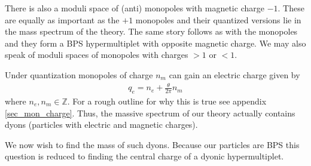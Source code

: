 \documentclass[12pt, onecolumn]{article}
\newenvironment{remark}[1][Remark]{\begin{trivlist}
\item[\hskip \labelsep {\bfseries #1}]}{\end{trivlist}}
\begin{document}
\begin{remark}
There is also a moduli space of (anti) monopoles with magnetic charge $-1$.  These are equally as important as the $+1$ monopoles and their quantized versions lie in the mass spectrum of the theory.  The same story follows as with the monopoles and they form a BPS hypermultiplet with opposite magnetic charge.  We may also speak of moduli spaces of monopoles with charges $>1$ or $<1$.
\end{remark}

\begin{remark}
Under quantization monopoles of charge $n_{m}$ can gain an electric charge given by
\begin{align*}
q_{e}=n_{e}+\frac{\theta}{2\pi}n_{m}
\end{align*}
where $n_{e},n_{m} \in \mathbb{Z}$.  For a rough outline for why this is true see appendix \ref{sec_mon_charge}.  Thus, the massive spectrum of our theory actually contains dyons (particles with electric and magnetic charges).
\end{remark}

\noindent We now wish to find the mass of such dyons.  Because our particles are BPS this question is reduced to finding the central charge of a dyonic hypermultiplet.
\end{document}
